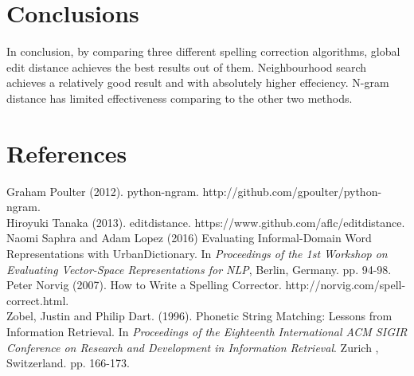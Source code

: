 \documentclass[11pt]{article}
\begin{document}
\section{Conclusions}
  In conclusion, by comparing three different spelling correction algorithms,
  global edit distance achieves the best results out of them. Neighbourhood search
  achieves a relatively good result and with absolutely higher effeciency. N-gram
  distance has limited effectiveness comparing to the other two methods.

\section{References}

  Graham Poulter (2012). python-ngram. http://github.com/gpoulter/python-ngram. \\

  Hiroyuki Tanaka (2013). editdistance. https://www.github.com/aflc/editdistance. \\

  Naomi Saphra and Adam Lopez (2016) Evaluating Informal-Domain Word Representations
  with UrbanDictionary. In \textit{Proceedings of the 1st Workshop on Evaluating Vector-Space
  Representations for NLP}, Berlin, Germany. pp. 94-98. \\

  Peter Norvig (2007). How to Write a Spelling Corrector. http://norvig.com/spell-correct.html. \\

  Zobel, Justin and Philip Dart. (1996). Phonetic String Matching: Lessons from
  Information Retrieval. In \textit{Proceedings of the Eighteenth International
  ACM SIGIR Conference on Research and Development in Information Retrieval}. Zurich
  , Switzerland. pp. 166-173. \\
\end{document}
